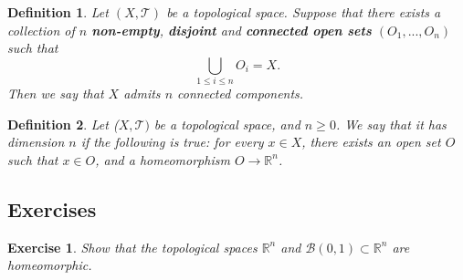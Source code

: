 \documentclass[a4paper,11pt]{article}
\theoremstyle{mytheor}
\newtheorem{definition}{Definition}[subsection]
\theoremstyle{mytheor}
\newtheorem{exercise}{Exercise}
\theoremstyle{remark}
\newcommand{\T}{\mathcal{T}}
\newcommand{\B}{\mathcal{B}}
\newcommand{\R}{\mathbb{R}}
\begin{document}
\begin{definition}
    Let $(X, \T)$ be a topological space. Suppose that there exists a
    collection of $n$ \textbf{non-empty}, \textbf{disjoint} and
    \textbf{connected open sets} $(O_1, ..., O_n)$ such that
    $$
    \bigcup_{1 \le i \le n} O_i = X.
    $$
    Then we say that $X$ admits $n$ connected components.
\end{definition}

\begin{definition}
    Let ($X, \T)$ be a topological space, and $n \geq 0$. We say that it has
    dimension $n$ if the following is true: for every $x \in X$, there exists
    an open set $O$ such that $x \in O$, and a homeomorphism $O \to \R^n$.
\end{definition}

\subsection{Exercises}

\begin{exercise}
    Show that the topological spaces $\R^n$ and $\B(0, 1) \subset \R^n$ are homeomorphic.
\end{exercise}
\end{document}

